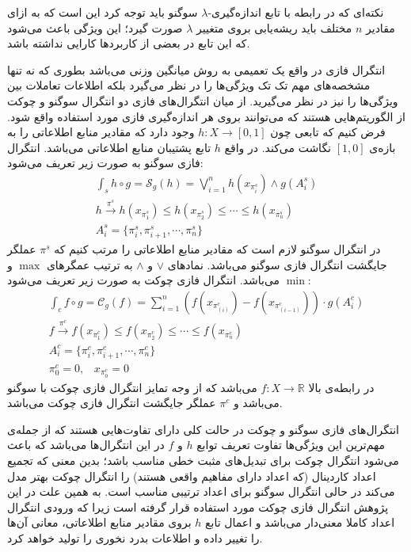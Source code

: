 نکته‌ای که در رابطه با تابع اندازه‌گیری-$\lambda$ سوگنو باید توجه کرد این است که به ازای مقادیر $n$ مختلف باید ریشه‌یابی بروی متغییر $\lambda$ صورت گیرد؛ این ویژگی‌ باعث می‌شود که این تابع در بعضی از کاربردها کارایی نداشته باشد.

انتگرال فازی در واقع یک تعمیمی به روش میانگین وزنی می‌باشد بطوری که نه تنها مشخصه‌های مهم تک تک ویژگی‌ها را در نظر می‌گیرد بلکه اطلاعات تعاملات بین ویژگی‌ها را نیز در نظر می‌گیرید. از میان انتگرال‌های فازی دو انتگرال سوگنو و چوکت از الگوریتم‌هایی هستند که می‌توانند بروی هر اندازه‌گیری‌ فازی مورد استفاده واقع شود. فرض کنیم که تابعی چون
$h : X \rightarrow [0, 1]$
وجود دارد که مقادیر منابع اطلاعاتی را به بازه‌ی $[1, 0]$ نگاشت می‌کند. در واقع $h$ تابع پشتیبان منابع اطلاعاتی می‌باشد. انتگرال فازی سوگنو به صورت زیر تعریف می‌شود:
\begin{eqnarray}
\int_{s} h \circ g = \mathcal{S}_g(h) = \bigvee_{i=1}^{n} h(x_{\pi_i^s}) \wedge g(A_i^s)\label{eq:sugeno_integral}\\
h \xrightarrow{\pi^s} h(x_{\pi_1^s}) \leq h(x_{\pi_2^s}) \leq \cdots \leq h(x_{\pi_n^s})\label{eq:fi_sugeno_perm_op}\\
A_i^s = \{\pi_i^s, \pi_{i+1}^s, \cdots, \pi_n^s\}\label{eq:fi_sugeno_perm_val}
\end{eqnarray}
در انتگرال‌ سوگنو لازم است که مقادیر منابع اطلاعاتی را مرتب کنیم که $\pi^s$ عملگر جایگشت انتگرال فازی سوگنو می‌باشد. نمادهای $\vee$ و $\wedge$ به ترتیب عمگرهای $\max$ و $\min$ می‌باشد. انتگرال فازی چوکت به صورت زیر تعریف می‌شود:
\begin{eqnarray}
\int_{c} f \circ g = \mathcal{C}_g(f) = \sum_{i = 1}^{n} \left( f(x_{\pi_{(i)}^c}) - f(x_{\pi_{(i-1)}^c}) \right) \cdot g(A_i^c)\label{eq:choquet_integral}\\
f \xrightarrow{\pi^c} f(x_{\pi_1^c}) \leq f(x_{\pi_2^c}) \leq \cdots \leq f(x_{\pi_n^c})\label{eq:fi_choquet_perm_op}\\
A_i^c = \{\pi_i^c, \pi_{i+1}^c, \cdots, \pi_n^c\}\label{eq:fi_choquet_perm_val}\\
\pi^c_0 = 0, \hspace{10pt} x_{\pi^c_0} = 0
\end{eqnarray}
در رابطه‌ی بالا
$f : X \rightarrow \mathbb{R}$
می‌باشد که از وجه تمایز انتگرال فازی چوکت با سوگنو می‌‌باشد و $\pi^c$ عملگر جایگشت انتگرال فازی چوکت می‌باشد.

انتگرال‌های فازی سوگنو و چوکت در حالت کلی دارای تفاوت‌هایی هستند که از جمله‌ی مهم‌ترین این ویژگی‌ها تفاوت تعریف توابع $h$ و $f$ در این انتگرال‌ها می‌باشد که باعث می‌شود انتگرال چوکت برای تبدیل‌های مثبت خطی مناسب باشد؛ بدین معنی که تجمیع اعداد کاردینال (که اعداد دارای مفاهیم واقعی هستند) را انتگرال چوکت بهتر مدل می‌کند در حالی انتگرال سوگنو برای اعداد ترتیبی مناسب است. به همین علت در این پژوهش انتگرال فازی چوکت مورد استفاده قرار گرفته است زیرا که ورودی انتگرال اعداد کاملا معنی‌دار می‌باشد و اعمال تابع $h$ بروی مقادیر منابع اطلاعاتی، معانی آن‌ها را تغییر داده و اطلاعات بدرد نخوری را تولید خواهد کرد.